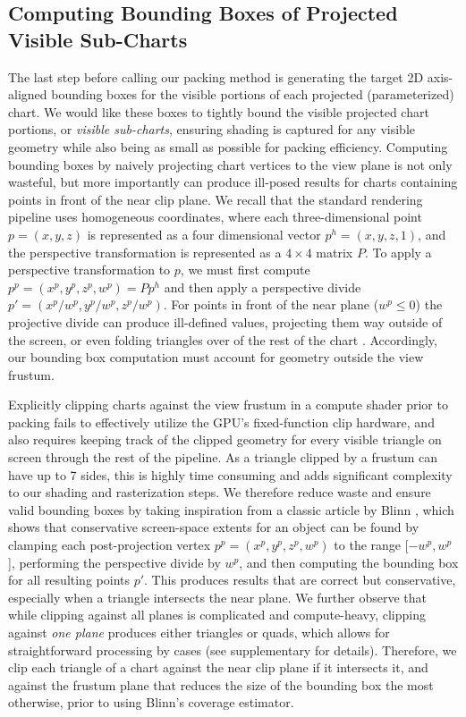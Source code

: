 \subsection{Computing Bounding Boxes of Projected Visible Sub-Charts}
\label{sec:box}

The last step before calling our packing method is generating the target 2D axis-aligned bounding boxes for the visible portions of each projected (parameterized) chart. 
We would like these boxes to tightly bound the visible projected chart portions, or {\em visible sub-charts}, ensuring shading is captured for any visible geometry while also being as small as possible for packing efficiency. Computing bounding boxes by naively projecting chart vertices to the view plane is not only wasteful, but more importantly can produce ill-posed results for charts containing points in front of the near clip plane. We recall that the standard rendering pipeline uses homogeneous coordinates, where each three-dimensional point $p=(x,y,z)$ is represented as a four dimensional vector $p^h=(x,y,z,1)$, and the perspective transformation is represented as a $4\times4$ matrix $P$. To apply a perspective transformation to $p$, we must first compute $p^p=(x^{p},y^{p},z^{p},w^{p}) = P p^h$ and then apply a perspective divide $p' = (x^{p}/w^{p},y^{p}/w^{p},z^{p}/w^{p})$. For points in front of the near plane ($w^{p}\leq0$) the projective divide can produce ill-defined values, projecting them way outside of the screen, or even folding triangles over of the rest of the chart \cite{blinn1978clipping}. Accordingly, our bounding box computation must account for geometry outside the view frustum.

Explicitly clipping charts against the view frustum in a compute shader prior to packing fails to effectively utilize the GPU's fixed-function clip hardware, and also requires keeping track of the clipped geometry for every visible triangle on screen through the rest of the pipeline. As a triangle clipped by a frustum can have up to 7 sides, this is highly time consuming and adds significant complexity to our shading and rasterization steps. We therefore reduce waste and ensure valid bounding boxes by taking inspiration from a classic article by Blinn , which shows that conservative screen-space extents for an object can be found by clamping each post-projection vertex $p^p = (x^p,y^p,z^p,w^p)$ to the range $[-w^p,w^p$], performing the perspective divide by $w^p$, and then computing the bounding box for all resulting points $p'$. This produces results that are correct but conservative, especially when a triangle intersects the near plane. We further observe that while clipping against all planes is complicated and compute-heavy, clipping against {\em one plane} produces either triangles or quads, which allows for straightforward processing by cases (see supplementary for details). Therefore, we clip each triangle of a chart against the near clip plane if it intersects it, and against the frustum plane that reduces the size of the bounding box the most otherwise, prior to using Blinn's coverage estimator. 

